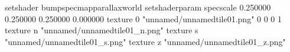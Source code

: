 setshader bumpspecmapparallaxworld
setshaderparam specscale 0.250000 0.250000 0.250000 0.000000
texture 0 "unnamed/unnamedtile01.png" 0 0 0 1
texture n "unnamed/unnamedtile01_n.png"
texture s "unnamed/unnamedtile01_s.png"
texture z "unnamed/unnamedtile01_z.png"